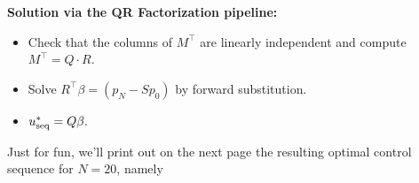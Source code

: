 \begin{tcolorbox}[sharp corners, colback=green!30, colframe=green!80!blue, title=\textbf{\Large Minimum Norm Solution to Steering a Robot}]
\textbf{Solution via the QR Factorization pipeline:}
\begin{itemize}
    \item Check that the columns of $M^\top$ are linearly independent and compute $M^\top = Q \cdot R.$
    \item Solve $R^\top \beta = \left( p_{N} - S p_0\right) $ by forward substitution.
    \item $u_{\rm seq}^\ast = Q \beta.$
\end{itemize}

\end{tcolorbox}

\vspace*{.7cm}

Just for fun, we'll print out on the next page the resulting optimal control sequence for $N=20$, namely

\newpage


